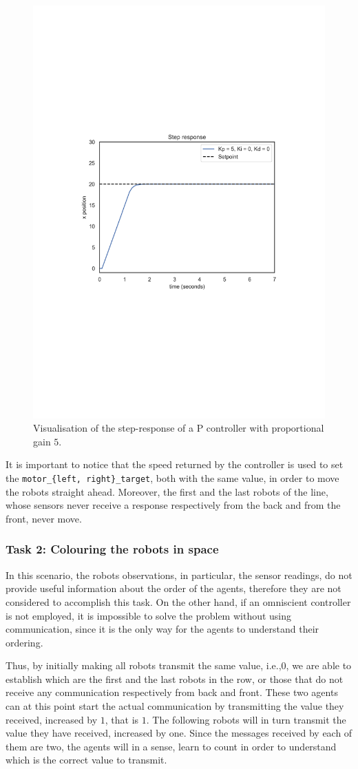 \begin{figure}[htb]
	\centering
	\includegraphics[width=.5\textwidth]{contents/images/Step-responsep=kp5ki0kd0}
	\caption[Step response of the proportinal PID controller.]{Visualisation of the 
		step-response of a P controller with proportional 
		gain $5$.}
	\label{fig:pid}
\end{figure}

It is important to notice that the speed returned by the controller is used to set the 
\texttt{motor\_\{left, right\}\_target}, both with the same value, in order to move 
the robots straight ahead. Moreover, the first and the last robots of the line, 
whose sensors never receive a response respectively from the back and from the 
front, never move.

\subsubsection{Task 2: Colouring the robots in space}
In this scenario, the robots observations, in particular, the sensor readings, do not 
provide useful information about the order of the agents, therefore they are not 
considered to accomplish this task.
On the other hand, if an omniscient controller is not employed, it is impossible to 
solve the problem without using communication, since it is the only way for the 
agents to understand their ordering.

Thus, by initially making all robots transmit the same value, i.e.,$0$, we are able 
to establish which are the first and the last robots in the row, or those that do not 
receive any communication respectively from back and front. 
These two agents can at this point start the actual communication by transmitting 
the value they received, increased by $1$, that is $1$. 
The following robots will in turn transmit the value they have received, increased 
by one. Since the messages received by each of them are two, the agents will in a 
sense, learn to count in order to understand which is the correct value to 
transmit.

